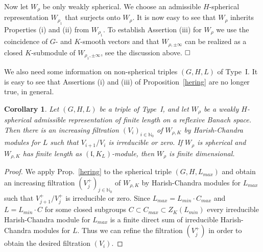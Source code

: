 \documentclass[10]{amsart}
\newtheorem{cor}[thm]{Corollary}
\theoremstyle{remark}
\theoremstyle{definition}
\numberwithin{equation}{section}
\newcommand{\N}{\mathbb{N}}           %
\newcommand{\fl}{{\mathfrak l}}
\begin{document}
{Now let $W_\rho$ be only weakly spherical. We choose an admissible $H$-spherical representation $W_{\rho_1}$ that surjects onto $W_\rho$. It is now easy to see
that $W_\rho$ inherits Properties (i) and (ii) from $W_{\rho_1}$. To establish Assertion (iii) for $W_\rho$  we use the coincidence of $G$- and $K$-smooth vectors and that $W_{\rho,\pm\infty}$ can be realized as a closed $K$-submodule of $W_{\rho_1,\pm\infty}$, see the discussion above.
$\hfill\Box$


We also need some information on non-spherical triples $(G,H,L)$ of Type~I. It is easy to  see that Assertions (i) and (iii) of Proposition~\ref{hering} are no longer true, in general.

\begin{cor}\label{makrele}
Let $(G,H,L)$ be a triple of Type~I, and let $W_\rho$ be a weakly $H$-spherical admissible representation of finite length on a reflexive Banach space. Then
there is an increasing filtration $(V_i)_{i\in\N_0}$  of $W_{\rho,K}$ by Harish-Chandra modules for $L$
such that $V_{i+1}/V_i$ is irreducible or zero. If $W_\rho$ is spherical and $W_{\rho,K}$ has finite length as $(\fl,K_L)$-module, then $W_\rho$ is finite dimensional.
\end{cor}

\begin{proof} We apply Prop.~\ref{hering} to the spherical triple $(G,H,L_{max})$ and obtain an increasing filtration $(V^+_j)_{j\in\N_0}$  of $W_{\rho,K}$ by Harish-Chandra modules for $L_{max}$
such that $V^+_{j+1}/V^+_j$ is irreducible or zero. Since $L_{max}=L_{min}\cdot C_{max}$ and $L=L_{min}\cdot C$ for some closed subgroups $C\subset C_{max}\subset Z_K(L_{min})$ every
irreducible Harish-Chandra module for $L_{max}$ is a finite direct sum of irreducible Harish-Chandra modules for $L$. Thus we can refine the filtration $(V_j^+)$ in order to obtain the
desired filtration $(V_i)$.
\end{proof}


}
\end{document}
